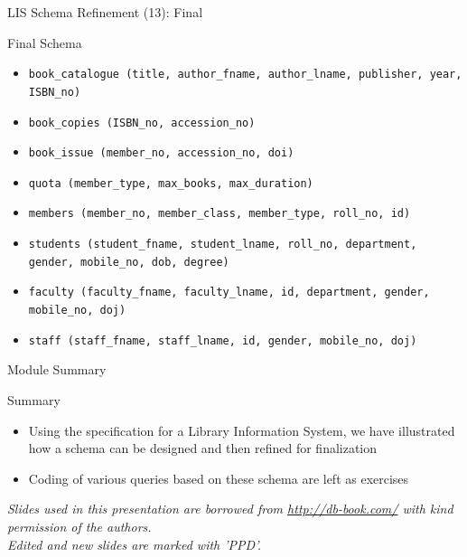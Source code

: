 \documentclass[aspectratio=169, xcolor=dvipsnames]{beamer}
\begin{document}
\begin{frame}{LIS Schema Refinement (13): Final}
    \begin{exampleblock}{Final Schema}
        \begin{itemize}[<+->]
            \item \texttt{book\_catalogue (title, author\_fname, author\_lname, publisher, year, ISBN\_no)}
            \item \texttt{book\_copies (ISBN\_no, accession\_no)}
            \item \texttt{book\_issue (member\_no, accession\_no, doi)}
            \item \texttt{quota (member\_type, max\_books, max\_duration)}
            \item \texttt{members (member\_no, member\_class, member\_type, roll\_no, id)}
            \item \texttt{students (student\_fname, student\_lname, roll\_no, department, gender, mobile\_no, dob, degree)}
            \item \texttt{faculty (faculty\_fname, faculty\_lname, id, department, gender, mobile\_no, doj)}
            \item \texttt{staff (staff\_fname, staff\_lname, id, gender, mobile\_no, doj)}
        \end{itemize}
    \end{exampleblock}
\end{frame}

\begin{frame}{Module Summary}
    \begin{block}{Summary}
        \begin{itemize}[<+->]
            \item Using the specification for a Library Information System, we have illustrated how a schema can be designed and then refined for finalization
            \item Coding of various queries based on these schema are left as exercises
        \end{itemize}
    \end{block}
    \vspace{2em}
    \begin{center}
    \small \textit{Slides used in this presentation are borrowed from \url{http://db-book.com/} with kind permission of the authors.} \\
    \small \textit{Edited and new slides are marked with 'PPD'.}
    \end{center}
\end{frame}
\end{document}
